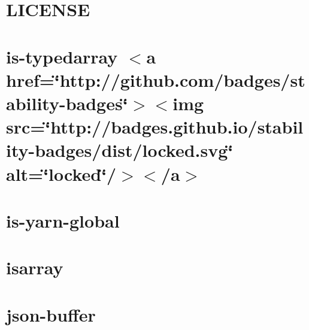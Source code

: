 \let\mypdfximage\pdfximage\def\pdfximage{\immediate\mypdfximage}\documentclass[twoside]{book}
\newcommand{\+}{\discretionary{\mbox{\scriptsize$\hookleftarrow$}}{}{}}
\begin{document}
\chapter{L\+I\+C\+E\+N\+SE}
\label{md__c_1__git_hub__p_r_o_y_e_c_t_o-_i_i_i-_g_o_t_rest-api_node_modules_is-typedarray__l_i_c_e_n_s_e}

\chapter{is-\/typedarray $<$a href=\char`\"{}http\+://github.\+com/badges/stability-\/badges\char`\"{}$>$$<$img src=\char`\"{}http\+://badges.\+github.\+io/stability-\/badges/dist/locked.\+svg\char`\"{} alt=\char`\"{}locked\char`\"{}/$>$$<$/a$>$}
\label{md__c_1__git_hub__p_r_o_y_e_c_t_o-_i_i_i-_g_o_t_rest-api_node_modules_is-typedarray__r_e_a_d_m_e}

\chapter{is-\/yarn-\/global}
\label{md__c_1__git_hub__p_r_o_y_e_c_t_o-_i_i_i-_g_o_t_rest-api_node_modules_is-yarn-global__r_e_a_d_m_e}

\chapter{isarray}
\label{md__c_1__git_hub__p_r_o_y_e_c_t_o-_i_i_i-_g_o_t_rest-api_node_modules_isarray__r_e_a_d_m_e}

\chapter{json-\/buffer}
\label{md__c_1__git_hub__p_r_o_y_e_c_t_o-_i_i_i-_g_o_t_rest-api_node_modules_json-buffer__r_e_a_d_m_e}

\end{document}
